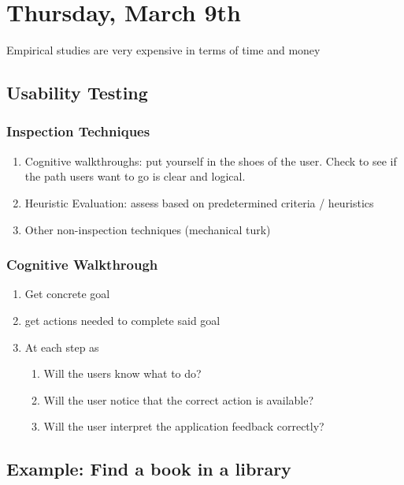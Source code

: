 \section{Thursday, March 9th}
\begin{shaded}
Empirical studies are very expensive in terms of time and money
\end{shaded}
\subsection{Usability Testing}
    \subsubsection{Inspection Techniques}
    \begin{enumerate}
        \item Cognitive walkthroughs: put yourself in the shoes of the user. Check to see if the path users want to go is clear and logical. 
        
        \item Heuristic Evaluation: assess based on predetermined criteria / heuristics

        \item Other non-inspection techniques (mechanical turk)
    \end{enumerate}

    \subsubsection{Cognitive Walkthrough}
    \begin{enumerate}
        \item Get concrete goal
        \item get actions needed to complete said goal
        \item At each step as
        \begin{enumerate}
            \item Will the users know what to do?
            \item Will the user notice that the correct action is available?
            \item Will the user interpret the application feedback correctly?
        \end{enumerate}
    \end{enumerate}

    \subsection{Example: Find a book in a library}

